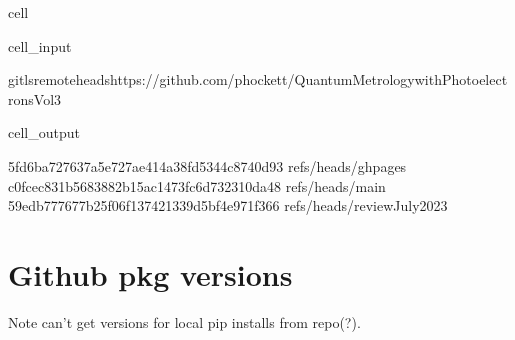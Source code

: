 \documentclass[letterpaper,table,10pt,english]{jupyterBook}
\begin{document}
\begin{sphinxuseclass}{cell}\begin{sphinxVerbatimInput}

\begin{sphinxuseclass}{cell_input}
\begin{sphinxVerbatim}[commandchars=\\\{\}]
gitls\PYGZhy{}remote\PYGZhy{}\PYGZhy{}headshttps://github.com/phockett/Quantum\PYGZhy{}Metrology\PYGZhy{}with\PYGZhy{}Photoelectrons\PYGZhy{}Vol3
\end{sphinxVerbatim}

\end{sphinxuseclass}\end{sphinxVerbatimInput}
\begin{sphinxVerbatimOutput}

\begin{sphinxuseclass}{cell_output}
\begin{sphinxVerbatim}[commandchars=\\\{\}]
5fd6ba727637a5e727ae414a38fd5344c8740d93	refs/heads/gh\PYGZhy{}pages
c0fcec831b5683882b15ac1473fc6d732310da48	refs/heads/main
59edb777677b25f06f137421339d5bf4e971f366	refs/heads/reviewJuly2023
\end{sphinxVerbatim}

\end{sphinxuseclass}\end{sphinxVerbatimOutput}

\end{sphinxuseclass}

\section{Github pkg versions}
\label{\detokenize{tests/build_versions_checks:github-pkg-versions}}
\sphinxAtStartPar
Note \sphinxhyphen{} can’t get versions for local pip installs from repo(?).
\end{document}
